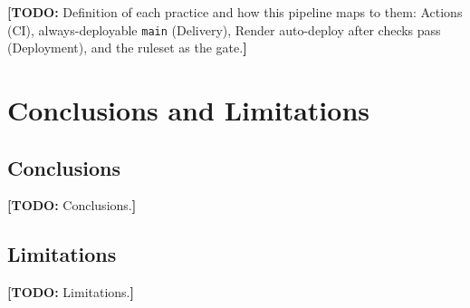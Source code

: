 \documentclass[10pt,a4paper]{article}
\newcommand{\todo}[1]{{\color{todored}\textbf{[TODO:} #1\textbf{]}}}
\begin{document}
\todo{Definition of each practice and how this pipeline maps to them:
Actions (CI), always-deployable \texttt{main} (Delivery), Render
auto-deploy after checks pass (Deployment), and the ruleset as the gate.}

\section{Conclusions and Limitations}

\subsection*{Conclusions}
\todo{Conclusions.}

\subsection*{Limitations}
\todo{Limitations.}
\end{document}
